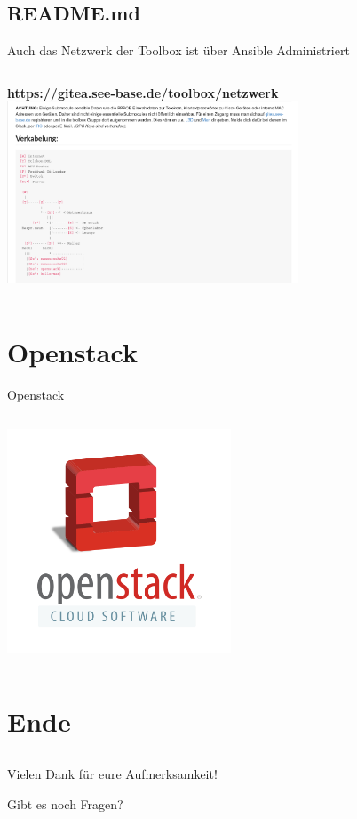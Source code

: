 \documentclass[aspectratio=169]{beamer}
\begin{document}
\subsection{README.md} 
\begin{frame}{Auch das Netzwerk der Toolbox ist über Ansible Administriert}
    \begin{columns}
        \begin{column}{1.0\textwidth}
            \centering
            \textbf{https://gitea.see-base.de/toolbox/netzwerk}
            \vspace{0.8cm}
            \includegraphics[width=0.65\textwidth]{netzwerk.png}
        \end{column}
    \end{columns}
\end{frame}



 
\section{Openstack} 
\begin{frame}{Openstack}
    \begin{columns}
        \begin{column}{1.0\textwidth}
            \centering
            \includegraphics[width=0.5\textwidth]{openstack.png}
        \end{column}
    \end{columns}
\end{frame}



\section{Ende}
 \subsection{}
\begin{frame}{}
    \begin{center}
        {\Huge Vielen Dank für eure Aufmerksamkeit!}
        
        \vspace{0.8cm}
        
        {\huge Gibt es noch Fragen?}
    \end{center}
\end{frame}
\end{document}
